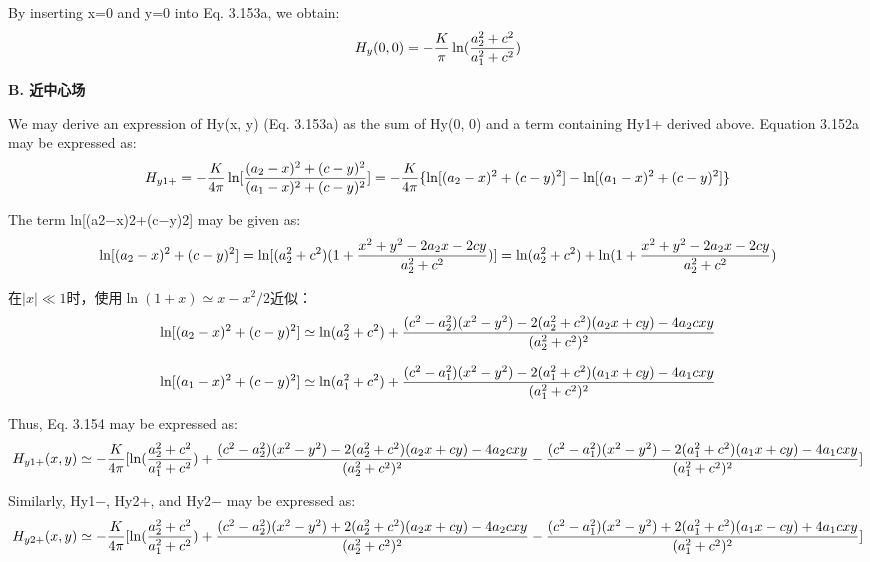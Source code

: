 By inserting x=0 and y=0 into Eq. 3.153a, we obtain:
$$
H_{y}(0,0)=-\frac{K}{\pi}\ln(\frac{a_{2}^{2}+c^{2}}{a_{1}^{2}+c^{2}})\\%
$$

\textbf{B. 近中心场}

We may derive an expression of Hy(x, y) (Eq. 3.153a) as the sum of Hy(0, 0) and
a term containing Hy1+ derived above. Equation 3.152a may be expressed as:
$$H_{y1+}=-\frac{K}{4\pi}\ln[\frac{(a_{2}-x)^{2}+(c-y)^{2}}{(a_{1}-x)^{2}+(c-y)^{2}}]\\
=-\frac{K}{4\pi}\{\ln[(a_{2}-x)^{2}+(c-y)^{2}]-\ln[(a_{1}-x)^{2}+(c-y)^{2}]\}\\%
$$

The term ln[(a2−x)2+(c−y)2] may be given as:
$$
\ln[(a_{2}-x)^{2}+(c-y)^{2}]=\ln[(a_{2}^{2}+c^{2})(1+\frac{x^{2}+y^{2}-2a_{2}x-2cy}{a_{2}^{2}+c^{2}})]\\
=\ln(a_{2}^{2}+c^{2})+\ln(1+\frac{x^{2}+y^{2}-2a_{2}x-2cy}{a_{2}^{2}+c^{2}})\\
$$

在$|x|\ll 1$时，使用$\ln(1+x)\simeq x-x^2 /2$近似：
$$
\ln[(a_{2}-x)^{2}+(c-y)^{2}]\simeq\ln(a_{2}^{2}+c^{2})\\
+\frac{(c^{2}-a_{2}^{2})(x^{2}-y^{2})-2(a_{2}^{2}+c^{2})(a_{2}x+cy)-4a_{2}cxy}{(a_{2}^{2}+c^{2})^{2}}\\
$$

$$
\ln[(a_{1}-x)^{2}+(c-y)^{2}]\simeq\ln(a_{1}^{2}+c^{2})\\
+\frac{(c^{2}-a_{1}^{2})(x^{2}-y^{2})-2(a_{1}^{2}+c^{2})(a_{1}x+cy)-4a_{1}cxy}{(a_{1}^{2}+c^{2})^{2}}\\
$$

Thus, Eq. 3.154 may be expressed as:
$$
H_{y1+}(x,y)\simeq-\frac{K}{4\pi}[\ln(\frac{a_{2}^{2}+c^{2}}{a_{1}^{2}+c^{2}})+\frac{(c^{2}-a_{2}^{2})(x^{2}-y^{2})-2(a_{2}^{2}+c^{2})(a_{2}x+cy)-4a_{2}cxy}{(a_{2}^{2}+c^{2})^{2}}\\
-\frac{(c^{2}-a_{1}^{2})(x^{2}-y^{2})-2(a_{1}^{2}+c^{2})(a_{1}x+cy)-4a_{1}cxy}{(a_{1}^{2}+c^{2})^{2}}]\\%
$$

Similarly, Hy1−, Hy2+, and Hy2− may be expressed as:
$$H_{y2+}(x,y)\simeq-\frac{K}{4\pi}[\ln(\frac{a_{2}^{2}+c^{2}}{a_{1}^{2}+c^{2}})+\frac{(c^{2}-a_{2}^{2})(x^{2}-y^{2})+2(a_{2}^{2}+c^{2})(a_{2}x+cy)-4a_{2}cxy}{(a_{2}^{2}+c^{2})^{2}}\\
-\frac{(c^{2}-a_{1}^{2})(x^{2}-y^{2})+2(a_{1}^{2}+c^{2})(a_{1}x-cy)+4a_{1}cxy}{(a_{1}^{2}+c^{2})^{2}}]\\%
$$

